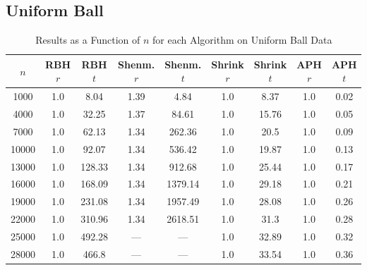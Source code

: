 \documentclass[11pt,twoside]{report}
\theoremstyle{definition}
\numberwithin{theorem}{section}
\numberwithin{definition}{section}
\numberwithin{lemma}{section}
\numberwithin{proposition}{section}
\numberwithin{equation}{section}
\numberwithin{figure}{section}
\begin{document}
\begin{appendices}
    
    \subsection{Uniform Ball}
    \begin{table}[ht]
        \centering
        \begin{tabular}{|c||c|c||c|c||c|c||c|c|}\hline
            $n$&RBH $r$&RBH $t$&Shenm. $r$&Shenm. $t$&Shrink $r$&Shrink $t$&APH $r$&APH $t$ \\ \hline
            1000&1.0&8.04&1.39&4.84&1.0&8.37&1.0&0.02 \\
            4000&1.0&32.25&1.37&84.61&1.0&15.76&1.0&0.05 \\
            7000&1.0&62.13&1.34&262.36&1.0&20.5&1.0&0.09 \\
            10000&1.0&92.07&1.34&536.42&1.0&19.87&1.0&0.13 \\
            13000&1.0&128.33&1.34&912.68&1.0&25.44&1.0&0.17 \\
            16000&1.0&168.09&1.34&1379.14&1.0&29.18&1.0&0.21 \\
            19000&1.0&231.08&1.34&1957.49&1.0&28.08&1.0&0.26 \\
            22000&1.0&310.96&1.34&2618.51&1.0&31.3&1.0&0.28 \\
            25000&1.0&492.28&---&---&1.0&32.89&1.0&0.32 \\
            28000&1.0&466.8&---&---&1.0&33.54&1.0&0.36 \\ \hline
        \end{tabular}
        \caption{Results as a Function of $n$ for each Algorithm on Uniform Ball Data}
        \label{tab:uniform_ball_table_n}
    \end{table}
    

\end{appendices}
\end{document}
